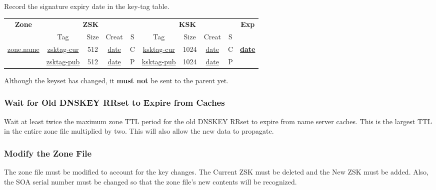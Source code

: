 


Record the signature expiry date in the key-tag table.

\begin{center}
\begin{tabular}{|c|c|c|c|c|c|c|c|c|c|}
\hline
{\bf Zone} &
\multicolumn{4}{c|}{{\bf ZSK}} &
\multicolumn{4}{c|}{{\bf KSK}} &
{\bf Exp} \\
\cline{2-9}

 & Tag & Size & Creat & S & Tag & Size & Creat & S & \\
\hline

\underline{zone.name}		&
\underline{zsktag-cur}		&
512			&
\underline{date}			&
C			&
\underline{ksktag-cur}		&
1024			&
\underline{date}			&
C			&
{\bf\underline{date}}	\\

\cline{2-9}

			&
\underline{zsktag-pub}	&
512			&
\underline{date}	&
P			&
\underline{ksktag-pub}		&
1024			&
\underline{date}			&
P			&
			\\

\hline
\end{tabular}
\end{center}

Although the keyset has changed, it {\bf must not} be sent to the parent yet.





\subsubsection{Wait for Old DNSKEY RRset to Expire from Caches}

Wait at least twice the maximum zone TTL period for the old DNSKEY RRset to
expire from name server caches.  This is the largest TTL in the entire zone
file multiplied by two.  This will also allow the new data to propagate.


\subsubsection{Modify the Zone File}

The zone file must be modified to account for the key changes.  The Current
ZSK must be deleted and the New ZSK must be added.  Also, the SOA serial
number must be changed so that the zone file's new contents will be recognized.

